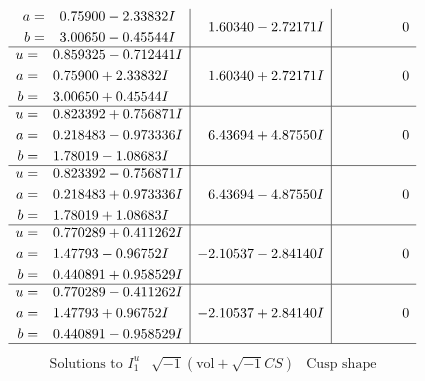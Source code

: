 \documentclass[1p]{elsarticle_modified}
\theoremstyle{definition}
\newcommand{\I}{\sqrt{-1}}
\begin{document}
$$\begin{array}{c|c|c}
\begin{aligned}
a &= \phantom{-}0.75900 - 2.33832 I \\
b &= \phantom{-}3.00650 - 0.45544 I\end{aligned}
 & \phantom{-}1.60340 - 2.72171 I & \phantom{-0.000000 } 0 \\ \hline\begin{aligned}
u &= \phantom{-}0.859325 - 0.712441 I \\
a &= \phantom{-}0.75900 + 2.33832 I \\
b &= \phantom{-}3.00650 + 0.45544 I\end{aligned}
 & \phantom{-}1.60340 + 2.72171 I & \phantom{-0.000000 } 0 \\ \hline\begin{aligned}
u &= \phantom{-}0.823392 + 0.756871 I \\
a &= \phantom{-}0.218483 - 0.973336 I \\
b &= \phantom{-}1.78019 - 1.08683 I\end{aligned}
 & \phantom{-}6.43694 + 4.87550 I & \phantom{-0.000000 } 0 \\ \hline\begin{aligned}
u &= \phantom{-}0.823392 - 0.756871 I \\
a &= \phantom{-}0.218483 + 0.973336 I \\
b &= \phantom{-}1.78019 + 1.08683 I\end{aligned}
 & \phantom{-}6.43694 - 4.87550 I & \phantom{-0.000000 } 0 \\ \hline\begin{aligned}
u &= \phantom{-}0.770289 + 0.411262 I \\
a &= \phantom{-}1.47793 - 0.96752 I \\
b &= \phantom{-}0.440891 + 0.958529 I\end{aligned}
 & -2.10537 - 2.84140 I & \phantom{-0.000000 } 0 \\ \hline\begin{aligned}
u &= \phantom{-}0.770289 - 0.411262 I \\
a &= \phantom{-}1.47793 + 0.96752 I \\
b &= \phantom{-}0.440891 - 0.958529 I\end{aligned}
 & -2.10537 + 2.84140 I & \phantom{-0.000000 } 0\\
 \hline 
 \end{array}$$\newpage$$\begin{array}{c|c|c}  
\text{Solutions to }I^u_{1}& \I (\text{vol} + \sqrt{-1}CS) & \text{Cusp shape}\\
 \hline 
\begin{aligned}

\end{aligned}
\end{array}$$
\end{document}
